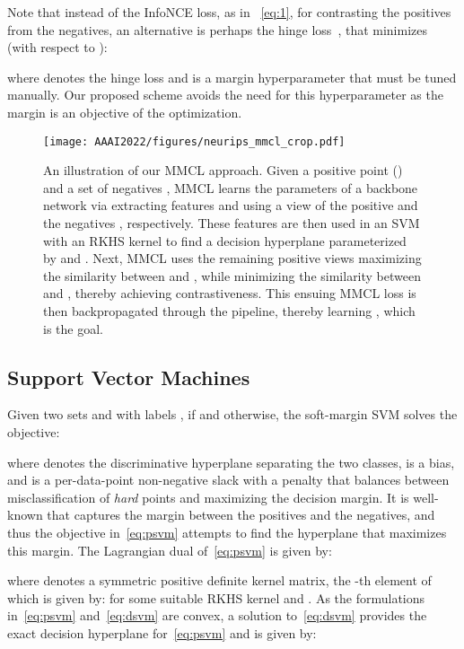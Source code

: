 \documentclass[letterpaper]{article} \usepackage{aaai22}  \usepackage{times}  \usepackage{helvet}  \usepackage{courier}  \usepackage[hyphens]{url}  \usepackage{graphicx} \urlstyle{rm} \def\UrlFont{\rm}  \usepackage{natbib}  \usepackage{caption} \DeclareCaptionStyle{ruled}{labelfont=normalfont,labelsep=colon,strut=off} \frenchspacing  \setlength{\pdfpagewidth}{8.5in}  \setlength{\pdfpageheight}{11in}
\begin{document}
Note that instead of the InfoNCE loss, as in ~\eqref{eq:1}, for contrasting the positives from the negatives, an alternative is perhaps the hinge loss~\cite{arora2019theoretical,chen2020simple}, that minimizes (with respect to ):


where  denotes the hinge loss and  is a margin hyperparameter that must be tuned manually. Our proposed scheme avoids the need for this hyperparameter as the margin is an objective of the optimization.

\begin{figure}
    \centering
    \texttt{[image: AAAI2022/figures/neurips\_mmcl\_crop.pdf]}
    \caption{An illustration of our MMCL approach. Given a positive point () and a set of negatives , MMCL learns the parameters  of a backbone network  via extracting features  and  using a view  of the positive  and the negatives , respectively. These features are then used in an SVM with an RKHS kernel  to find a decision hyperplane parameterized by  and . Next, MMCL uses the remaining positive views  maximizing the similarity between  and , while minimizing the similarity between  and , thereby achieving contrastiveness. This ensuing MMCL loss is then backpropagated through the pipeline, thereby learning , which is the goal.}
    \label{fig:representative_figure}
\end{figure}

\subsection{Support Vector Machines}
Given two sets  and  with labels , if  and  otherwise, the soft-margin SVM solves the objective:

where  denotes the discriminative hyperplane separating the two classes,  is a bias, and  is a per-data-point non-negative slack with a penalty  that balances between misclassification of \emph{hard} points and maximizing the decision margin. It is well-known that  captures the margin between the positives and the negatives, and thus the objective in~\eqref{eq:psvm} attempts to find the hyperplane  that maximizes this margin. The Lagrangian dual of~\eqref{eq:psvm} is given by:

where  denotes a symmetric positive definite kernel matrix, the -th element of which is given by:  for some suitable RKHS kernel  and . As the formulations in~\eqref{eq:psvm} and~\eqref{eq:dsvm} are convex, a solution  to~\eqref{eq:dsvm} provides the exact decision hyperplane for~\eqref{eq:psvm} and is given by:
\end{document}
